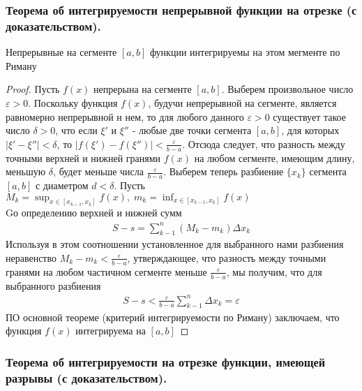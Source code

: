 \documentclass[10pt]{article}
\begin{document}
    \subsubsection{Теорема об интегрируемости непрерывной функции на отрезке (с доказательством).}
    \begin{theorem}
        Непрерывные на сегменте $[a, b]$ функции интегрируемы на этом мегменте по Риману
    \end{theorem}
    \begin{proof}
        Пусть $f(x)$ непрерына на сегменте $[a, b]$. Выберем произвольное число $\varepsilon > 0$. Поскольку функция $f(x)$, будучи непрерывной на сегменте, является равномерно непрерывной н нем, то для любого данного $\varepsilon > 0$ существует такое число $\delta > 0$, что если $\xi'$ и $\xi''$ - любые две точки сегмента $[a, b]$, для которых $|\xi' - \xi''| < \delta$, то $|f(\xi') - f(\xi'')| < \frac{\varepsilon}{b-a}$. Отсюда следует, что разность между точными верхней и нижней гранями $f(x)$ на любом сегменте, имеющим длину, меньшую $\delta$, будет меньше числа $\frac{\varepsilon}{b-a}$. Выберем теперь разбиение $\{x_k\}$ сегмента $[a, b]$ с диаметром $d<\delta$. Пусть $M_k = \sup_{x \in [x_{k-1}, x_k]} f(x),\; m_k= \inf_{x \in [x_{k-1}, x_k]} f(x)$\\
        Gо определению верхней и нижней сумм
        \begin{gather*}
            S-s = \sum_{k-1}^n (M_k - m_k) \Delta x_k
        \end{gather*}
        Используя в этом соотношении установленное для выбранного нами разбиения неравенство $M_k - m_k < \frac{\varepsilon}{b-a}$, утверждающее, что разность между точными гранями на любом частичном сегменте меньше $\frac{\varepsilon}{b-a}$, мы получим, что для выбранного разбиения
        \begin{gather*}
            S-s<\frac{\varepsilon}{b-a}\sum_{k-1}^n \Delta x_k = \varepsilon
        \end{gather*}
        ПО основной теореме (критерий интегрируемости по Риману) заключаем, что функция $f(x)$ интегрируема на $[a, b]$
    \end{proof}



    \subsubsection{Теорема об интегрируемости на отрезке функции, имеющей разрывы (с доказательством).}
\end{document}
